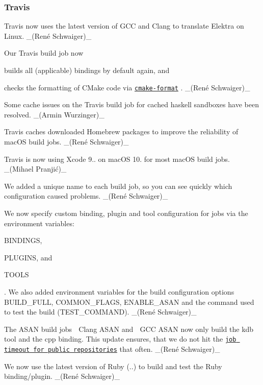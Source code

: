 \subsubsection*{Travis}


\begin{DoxyItemize}
\item Travis now uses the latest version of G\+CC and Clang to translate Elektra on Linux. \+\_\+(René Schwaiger)\+\_\+
\item Our Travis build job now
\begin{DoxyItemize}
\item builds all (applicable) bindings by default again, and
\item checks the formatting of C\+Make code via \href{https://github.com/cheshirekow/cmake_format}{\tt {\ttfamily cmake-\/format}} . \+\_\+(René Schwaiger)\+\_\+
\end{DoxyItemize}
\item Some cache issues on the Travis build job for cached haskell sandboxes have been resolved. \+\_\+(\+Armin Wurzinger)\+\_\+
\item Travis caches downloaded Homebrew packages to improve the reliability of mac\+OS build jobs. \+\_\+(René Schwaiger)\+\_\+
\item Travis is now using Xcode 9.. on mac\+OS 10. for most mac\+OS build jobs. \+\_\+(Mihael Pranjić)\+\_\+
\item We added a unique name to each build job, so you can see quickly which configuration caused problems. \+\_\+(René Schwaiger)\+\_\+
\item We now specify custom binding, plugin and tool configuration for jobs via the environment variables\+:
\begin{DoxyItemize}
\item {\ttfamily B\+I\+N\+D\+I\+N\+GS},
\item {\ttfamily P\+L\+U\+G\+I\+NS}, and
\item {\ttfamily T\+O\+O\+LS}
\end{DoxyItemize}

. We also added environment variables for the build configuration options {\ttfamily B\+U\+I\+L\+D\+\_\+\+F\+U\+LL}, {\ttfamily C\+O\+M\+M\+O\+N\+\_\+\+F\+L\+A\+GS}, {\ttfamily E\+N\+A\+B\+L\+E\+\_\+\+A\+S\+AN} and the command used to test the build ({\ttfamily T\+E\+S\+T\+\_\+\+C\+O\+M\+M\+A\+ND}). \+\_\+(René Schwaiger)\+\_\+
\item The A\+S\+AN build jobs {\ttfamily 🍏 Clang A\+S\+AN} and {\ttfamily 🐧 G\+CC A\+S\+AN} now only build the {\ttfamily kdb} tool and the {\ttfamily cpp} binding. This update ensures, that we do not hit the \href{https://docs.travis-ci.com/user/customizing-the-build/#build-timeouts}{\tt job timeout for public repositories} that often. \+\_\+(René Schwaiger)\+\_\+
\item We now use the latest version of Ruby ({..}) to build and test the Ruby binding/plugin. \+\_\+(René Schwaiger)\+\_\+
\end{DoxyItemize}


